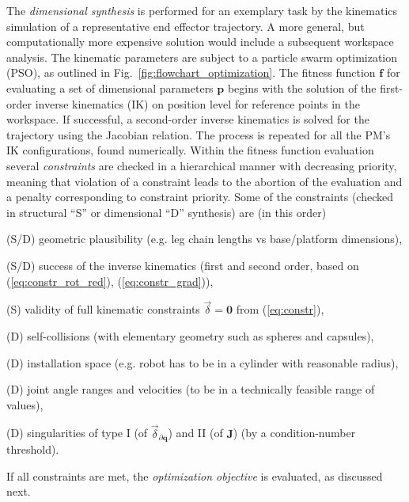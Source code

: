 \documentclass[
	graybox,
	vecphys] %
	{svmult}
\newcommand{\bm}[1]{\boldsymbol{#1}}
\newcommand{\Res}[0]{\vec{\delta}}
\newcommand{\ResR}[0]{\vec{\psi}}
\begin{document}
The \emph{dimensional synthesis} is performed for an exemplary task by the kinematics simulation of a representative end effector trajectory. %
A more general, but computationally more expensive solution would include a subsequent workspace analysis.
The kinematic parameters are subject to a particle swarm optimization (PSO), as outlined in Fig.~\ref{fig:flowchart_optimization}.
The fitness function $\bm{f}$ for evaluating a set of dimensional parameters $\bm{p}$ begins with the solution of the first-order inverse kinematics (IK) on position level 
for reference points in the workspace. 
If successful, a second-order inverse kinematics is solved for the trajectory using the Jacobian relation.
The process is repeated for all the PM's IK configurations, found numerically.
Within the fitness function evaluation several \emph{constraints} are checked in a hierarchical manner with decreasing priority, meaning that violation of a constraint leads to the abortion of the evaluation and a penalty corresponding to constraint priority.
Some of the constraints (checked in structural ``S'' or dimensional ``D'' synthesis) are (in this order)	
\begin{compactitem}
\item[(S/D)] geometric plausibility (e.g. leg chain lengths vs base/platform dimensions), 
\item[(S/D)] success of the inverse kinematics (first and second order, based on (\ref{eq:constr_rot_red}), (\ref{eq:constr_grad})), 
\item[(S)] validity of full kinematic constraints $\Res=\bm{0}$ from (\ref{eq:constr}),
\item[(D)] self-collisions (with elementary geometry such as spheres and capsules), 
\item[(D)] installation space (e.g. robot has to be in a cylinder with reasonable radius),
\item[(D)] joint angle ranges and velocities (to be in a technically feasible range of values),
\item[(D)] singularities of type I (of $\Res_{\partial \bm{q}}$) and II (of $\bm{J}$) (by a condition-number threshold).
\end{compactitem}
If all constraints are met, the \emph{optimization objective} is evaluated, as discussed next.
\end{document}
